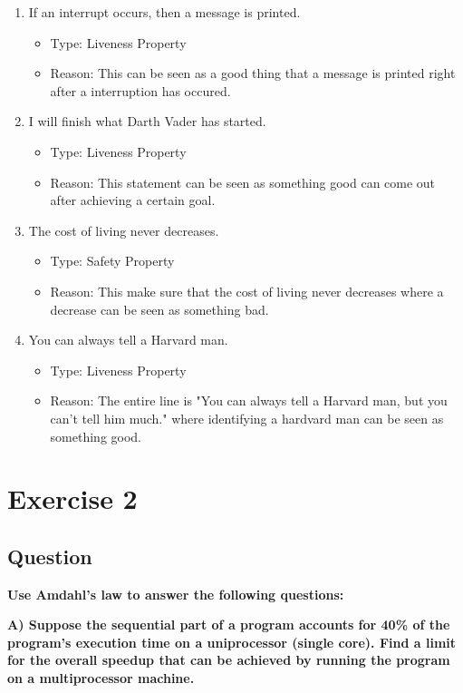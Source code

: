 \documentclass{article}
\begin{document}
\begin{enumerate}
    \item If an interrupt occurs, then a message is printed.
    \begin{itemize}
        \item Type: Liveness Property
        \item Reason: This can be seen as a good thing that a message is printed right after a interruption has occured.
    \end{itemize}

    \item I will finish what Darth Vader has started.
    \begin{itemize}
        \item Type: Liveness Property
        \item Reason: This statement can be seen as something good can come out after achieving a certain goal.
    \end{itemize}

    \item The cost of living never decreases.
    \begin{itemize}
        \item Type: Safety Property
        \item Reason: This make sure that the cost of living never decreases where a decrease can be seen as something bad.
    \end{itemize}

    \item You can always tell a Harvard man.
    \begin{itemize}
        \item Type: Liveness Property
        \item Reason: The entire line is "You can always tell a Harvard man, but you can't tell him much." where identifying a hardvard man can be seen as something good.
    \end{itemize}
\end{enumerate}


\section*{Exercise 2}

\subsection*{Question}
\textbf{Use Amdahl’s law to answer the following questions:}

\textbf{A) Suppose the sequential part of a program accounts for 40\% of the program’s execution time on a uniprocessor (single core). Find a limit for the overall speedup that can be achieved by running the program on a multiprocessor machine.}
\end{document}
